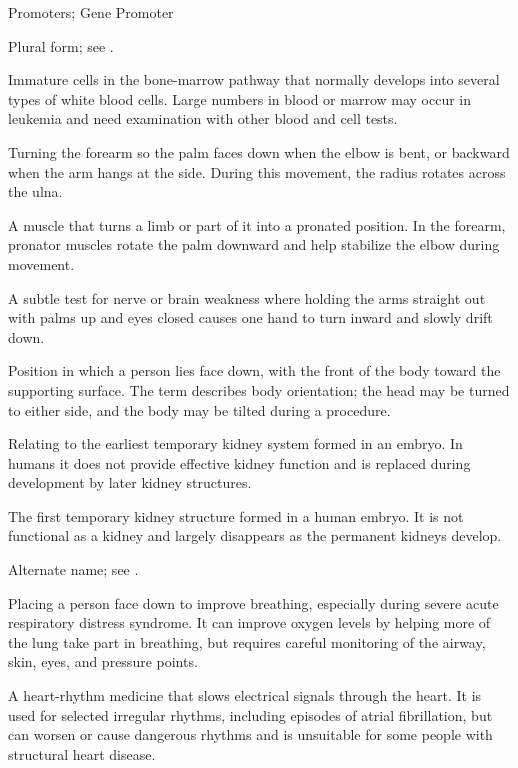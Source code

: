 \synonyms
Promoters; Gene Promoter

 Plural form; see .

 Immature cells in the bone-marrow pathway that normally develops into several types of white blood cells. Large numbers in blood or marrow may occur in leukemia and need examination with other blood and cell tests.

 Turning the forearm so the palm faces down when the elbow is bent, or backward when the arm hangs at the side. During this movement, the radius rotates across the ulna.

 A muscle that turns a limb or part of it into a pronated position. In the forearm, pronator muscles rotate the palm downward and help stabilize the elbow during movement.

 A subtle test for nerve or brain weakness where holding the arms straight out with palms up and eyes closed causes one hand to turn inward and slowly drift down.

 Position in which a person lies face down, with the front of the body toward the supporting surface. The term describes body orientation; the head may be turned to either side, and the body may be tilted during a procedure.

 Relating to the earliest temporary kidney system formed in an embryo. In humans it does not provide effective kidney function and is replaced during development by later kidney structures.

 The first temporary kidney structure formed in a human embryo. It is not functional as a kidney and largely disappears as the permanent kidneys develop.

 Alternate name; see .

 Placing a person face down to improve breathing, especially during severe acute respiratory distress syndrome. It can improve oxygen levels by helping more of the lung take part in breathing, but requires careful monitoring of the airway, skin, eyes, and pressure points.

 A heart-rhythm medicine that slows electrical signals through the heart. It is used for selected irregular rhythms, including episodes of atrial fibrillation, but can worsen or cause dangerous rhythms and is unsuitable for some people with structural heart disease.

